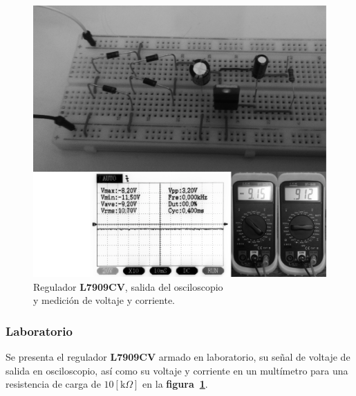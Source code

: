 \begin{figure}[!h]
\centering
\includegraphics[scale=0.26]{fotos/10.regulador2.eps}
\caption{Regulador \textbf{L7909CV}, salida del osciloscopio\\
y medición de voltaje y corriente.}
\label{laboratorio12}
\end{figure}

\subsubsection{Laboratorio}
Se presenta el regulador \textbf{L7909CV} armado en laboratorio, su señal de
voltaje de salida en osciloscopio, así como su voltaje y corriente en un
multímetro para una resistencia de carga de $10[\text{k}\Omega]$ en la
\textbf{figura~\ref{laboratorio12}}.

